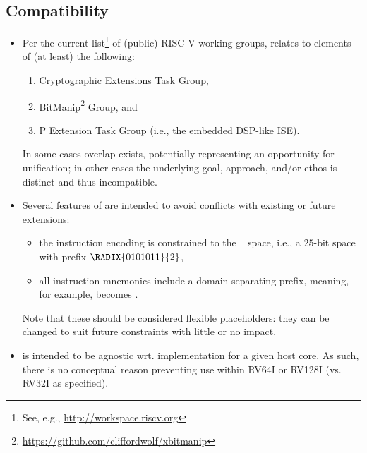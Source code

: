 
\subsection{Compatibility}
\label{sec:bg:compatibility}

\begin{itemize}

\item Per the current list\footnote{
      See, e.g., \url{http://workspace.riscv.org}
      } of (public) RISC-V working groups, 
      \XCID relates to elements of (at least) the following:

      \begin{enumerate}
      \item Cryptographic Extensions Task Group,
      \item BitManip\footnote{
            \url{https://github.com/cliffordwolf/xbitmanip}
            }                             Group,
            and
      \item P             Extension  Task Group (i.e., the embedded DSP-like ISE).
      \end{enumerate}

      \noindent
      In some cases overlap exists, potentially representing an opportunity
      for unification; in other cases the underlying goal, approach, and/or
      ethos is distinct and thus incompatible.

\item Several features of \XCID are intended to avoid conflicts with existing 
      or future extensions:

      \begin{itemize}
      \item the instruction encoding is constrained to the 
            ~\cite[Table 19.1]{SCARV:RV:ISA:I:17}
            space, i.e., a $25$-bit space with prefix $\RADIX{0101011}{2}$,
      \item all instruction mnemonics include a domain-separating prefix,
            meaning, for example,  becomes .
      \end{itemize}
      
      \noindent
      Note that these should be considered flexible placeholders: they can
      be changed to suit future constraints with little or no impact.

\item \XCID is intended to be agnostic wrt. implementation for a given host 
      core.  As such, there is no conceptual reason preventing use within
      RV64I or RV128I (vs. RV32I as specified).  

\end{itemize}

